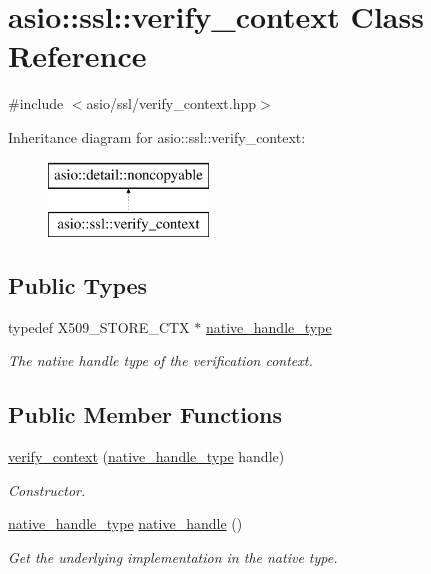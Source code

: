 \hypertarget{classasio_1_1ssl_1_1verify__context}{}\section{asio\+:\+:ssl\+:\+:verify\+\_\+context Class Reference}
\label{classasio_1_1ssl_1_1verify__context}


{\ttfamily \#include $<$asio/ssl/verify\+\_\+context.\+hpp$>$}

Inheritance diagram for asio\+:\+:ssl\+:\+:verify\+\_\+context\+:\begin{figure}[H]
\begin{center}
\leavevmode
\includegraphics[height=2.000000cm]{classasio_1_1ssl_1_1verify__context}
\end{center}
\end{figure}
\subsection*{Public Types}
\begin{DoxyCompactItemize}
\item 
typedef X509\+\_\+\+S\+T\+O\+R\+E\+\_\+\+C\+T\+X $\ast$ \hyperlink{classasio_1_1ssl_1_1verify__context_a73956909dd38aaf2e244fe2df73e13ce}{native\+\_\+handle\+\_\+type}
\begin{DoxyCompactList}\small\item\em The native handle type of the verification context. \end{DoxyCompactList}\end{DoxyCompactItemize}
\subsection*{Public Member Functions}
\begin{DoxyCompactItemize}
\item 
\hyperlink{classasio_1_1ssl_1_1verify__context_a9730cba171b03605c833b0bdf855b155}{verify\+\_\+context} (\hyperlink{classasio_1_1ssl_1_1verify__context_a73956909dd38aaf2e244fe2df73e13ce}{native\+\_\+handle\+\_\+type} handle)
\begin{DoxyCompactList}\small\item\em Constructor. \end{DoxyCompactList}\item 
\hyperlink{classasio_1_1ssl_1_1verify__context_a73956909dd38aaf2e244fe2df73e13ce}{native\+\_\+handle\+\_\+type} \hyperlink{classasio_1_1ssl_1_1verify__context_a1910482a6eacb6e50ef332878075795d}{native\+\_\+handle} ()
\begin{DoxyCompactList}\small\item\em Get the underlying implementation in the native type. \end{DoxyCompactList}\end{DoxyCompactItemize}


